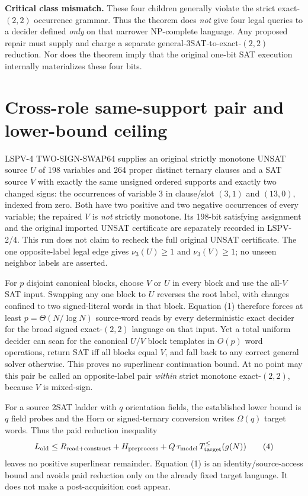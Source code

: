 \documentclass[11pt]{article}
\begin{document}
\textbf{Critical class mismatch.} These four children generally violate the strict exact-$(2,2)$ occurrence grammar. Thus the theorem does \emph{not} give four legal queries to a decider defined \emph{only} on that narrower NP-complete language. Any proposed repair must supply and charge a separate general-3SAT-to-exact-$(2,2)$ reduction. Nor does the theorem imply that the original one-bit SAT execution internally materializes these four bits.

\section{Cross-role same-support pair and lower-bound ceiling}
LSPV-4 TWO-SIGN-SWAP64 supplies an original strictly monotone UNSAT source $U$ of 198 variables and 264 proper distinct ternary clauses and a SAT source $V$ with exactly the same unsigned ordered supports and exactly two changed signs: the occurrences of variable 3 in clause/slot $(3,1)$ and $(13,0)$, indexed from zero. Both have two positive and two negative occurrences of every variable; the repaired $V$ is \emph{not} strictly monotone. Its 198-bit satisfying assignment and the original imported UNSAT certificate are separately recorded in LSPV-2/4. This run does not claim to recheck the full original UNSAT certificate. The one opposite-label legal edge gives $\nu_3(U)\ge1$ and $\nu_3(V)\ge1$; no unseen neighbor labels are asserted.

For $p$ disjoint canonical blocks, choose $V$ or $U$ in every block and use the all-$V$ SAT input. Swapping any one block to $U$ reverses the root label, with changes confined to two signed-literal words in that block. Equation (1) therefore forces at least $p=\Theta(N/\log N)$ source-word reads by every deterministic exact decider for the broad signed exact-$(2,2)$ language on that input. Yet a total uniform decider can scan for the canonical $U/V$ block templates in $O(p)$ word operations, return SAT iff all blocks equal $V$, and fall back to any correct general solver otherwise. This proves no superlinear continuation bound. At no point may this pair be called an opposite-label pair \emph{within} strict monotone exact-$(2,2)$, because $V$ is mixed-sign.

For a source 2SAT ladder with $q$ orientation fields, the established lower bound is $q$ field probes and the Horn or signed-ternary conversion writes $\Omega(q)$ target words. Thus the paid reduction inequality
\[
 L_{\rm old}\le R_{\rm read+construct}+H_{\rm preprocess}
 +Q\,\tau_{\rm model}\,T_{\rm target}^{\le}(g(N))
\tag{4}
\]
leaves no positive superlinear remainder. Equation (1) is an identity/source-access bound and avoids paid reduction only on the already fixed target language. It does not make a post-acquisition cost appear.
\end{document}

